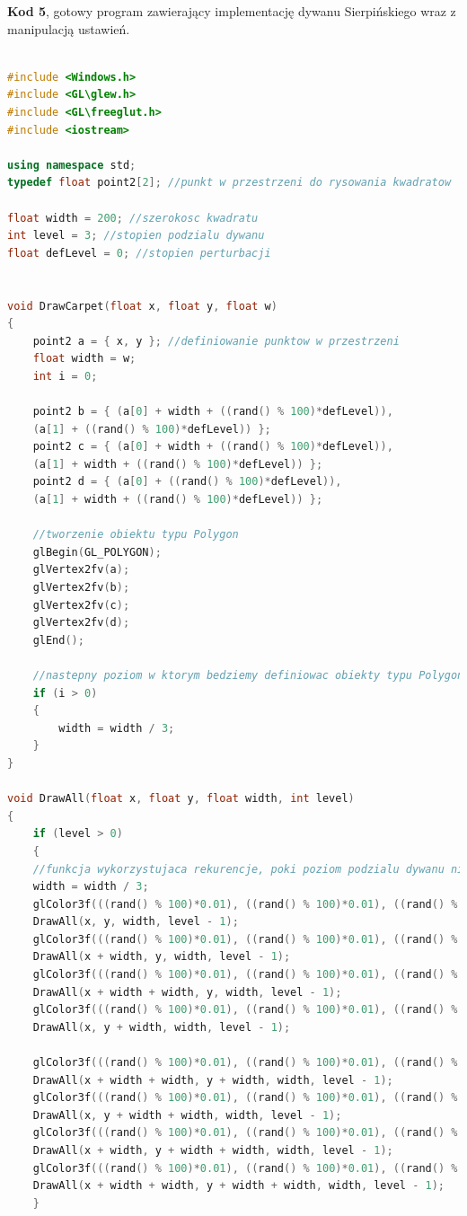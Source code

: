 \documentclass[polish,polish,a4paper]{article}
\begin{document}
\textbf{Kod 5}, gotowy program zawierający implementację dywanu Sierpińskiego wraz z manipulacją ustawień.
{\small
\begin{lstlisting}[language=C++]

#include <Windows.h>
#include <GL\glew.h>
#include <GL\freeglut.h>
#include <iostream>

using namespace std;
typedef float point2[2]; //punkt w przestrzeni do rysowania kwadratow

float width = 200; //szerokosc kwadratu
int level = 3; //stopien podzialu dywanu
float defLevel = 0; //stopien perturbacji


void DrawCarpet(float x, float y, float w)
{
	point2 a = { x, y }; //definiowanie punktow w przestrzeni
	float width = w;
	int i = 0;

	point2 b = { (a[0] + width + ((rand() % 100)*defLevel)), 
	(a[1] + ((rand() % 100)*defLevel)) };
	point2 c = { (a[0] + width + ((rand() % 100)*defLevel)), 
	(a[1] + width + ((rand() % 100)*defLevel)) };
	point2 d = { (a[0] + ((rand() % 100)*defLevel)), 
	(a[1] + width + ((rand() % 100)*defLevel)) };

	//tworzenie obiektu typu Polygon
	glBegin(GL_POLYGON);
	glVertex2fv(a);
	glVertex2fv(b);
	glVertex2fv(c);
	glVertex2fv(d);
	glEnd();

	//nastepny poziom w ktorym bedziemy definiowac obiekty typu Polygon, trzy razy mniejsze
	if (i > 0)
	{
		width = width / 3;
	}
}

void DrawAll(float x, float y, float width, int level)
{
	if (level > 0)
	{
	//funkcja wykorzystujaca rekurencje, poki poziom podzialu dywanu nie zejdzie do 0
	width = width / 3;
	glColor3f(((rand() % 100)*0.01), ((rand() % 100)*0.01), ((rand() % 100)*0.01));
	DrawAll(x, y, width, level - 1);
	glColor3f(((rand() % 100)*0.01), ((rand() % 100)*0.01), ((rand() % 100)*0.01));
	DrawAll(x + width, y, width, level - 1);
	glColor3f(((rand() % 100)*0.01), ((rand() % 100)*0.01), ((rand() % 100)*0.01));
	DrawAll(x + width + width, y, width, level - 1);
	glColor3f(((rand() % 100)*0.01), ((rand() % 100)*0.01), ((rand() % 100)*0.01));
	DrawAll(x, y + width, width, level - 1);

	glColor3f(((rand() % 100)*0.01), ((rand() % 100)*0.01), ((rand() % 100)*0.01));
	DrawAll(x + width + width, y + width, width, level - 1);
	glColor3f(((rand() % 100)*0.01), ((rand() % 100)*0.01), ((rand() % 100)*0.01));
	DrawAll(x, y + width + width, width, level - 1);
	glColor3f(((rand() % 100)*0.01), ((rand() % 100)*0.01), ((rand() % 100)*0.01));
	DrawAll(x + width, y + width + width, width, level - 1);
	glColor3f(((rand() % 100)*0.01), ((rand() % 100)*0.01), ((rand() % 100)*0.01));
	DrawAll(x + width + width, y + width + width, width, level - 1);
	}


\end{lstlisting}}
\end{document}
